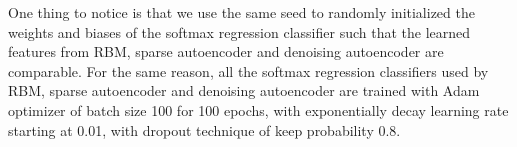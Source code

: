 One thing to notice is that we use the same seed to randomly initialized the weights and biases
of the softmax regression classifier such that the learned features from RBM, sparse autoencoder and
denoising autoencoder are comparable.
For the same reason, all the softmax regression classifiers used by RBM, sparse autoencoder and
denoising autoencoder are trained with Adam optimizer of batch size 100 for 100 epochs,
with exponentially decay learning rate starting at 0.01,
with dropout technique of keep probability 0.8.

